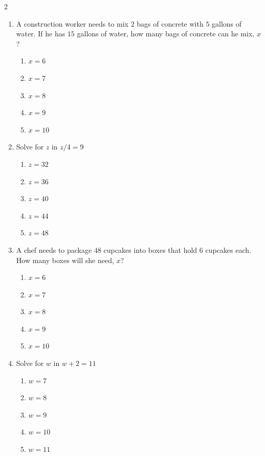 \documentclass[10pt]{article}
\begin{document}
\begin{multicols}{2}
\begin{enumerate}[label=\textbf{Q\arabic*.}, leftmargin=*, itemsep=6pt, parsep=0pt]
  \item \small A construction worker needs to mix $2$ bags of concrete with $5$ gallons of water. If he has $15$ gallons of water, how many bags of concrete can he mix, $x$?
  \begin{enumerate}[label=(\Alph*), leftmargin=0.6cm, nosep, itemsep=2pt]
    \item $x = 6$
    \item $x = 7$
    \item $x = 8$
    \item $x = 9$
    \item $x = 10$
  \end{enumerate}

  \item \small Solve for $z$ in $z/4 = 9$
  \begin{enumerate}[label=(\Alph*), leftmargin=0.6cm, nosep, itemsep=2pt]
    \item $z = 32$
    \item $z = 36$
    \item $z = 40$
    \item $z = 44$
    \item $z = 48$
  \end{enumerate}

  \item \small A chef needs to package $48$ cupcakes into boxes that hold $6$ cupcakes each. How many boxes will she need, $x$?
  \begin{enumerate}[label=(\Alph*), leftmargin=0.6cm, nosep, itemsep=2pt]
    \item $x = 6$
    \item $x = 7$
    \item $x = 8$
    \item $x = 9$
    \item $x = 10$
  \end{enumerate}

  \item \small Solve for $w$ in $w + 2 = 11$
  \begin{enumerate}[label=(\Alph*), leftmargin=0.6cm, nosep, itemsep=2pt]
    \item $w = 7$
    \item $w = 8$
    \item $w = 9$
    \item $w = 10$
    \item $w = 11$
  \end{enumerate}


\end{enumerate}
\end{multicols}
\end{document}
